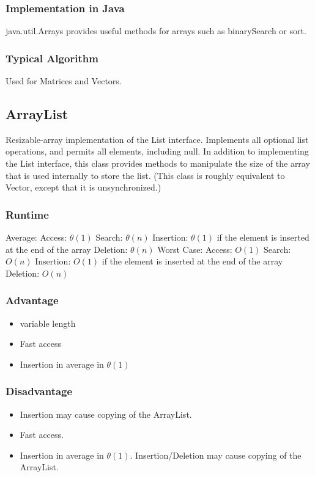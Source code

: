 \documentclass[12pt,a4paper]{article}
\newcommand{\RuntimeHead}{Runtime}
\newcommand{\AdvantageHead}{Advantage}
\newcommand{\DisadvantageHead}{Disadvantage}
\newcommand{\ImplementationInJavaHead}{Implementation in Java}
\newcommand{\TypicalAlgorithmHead}{Typical Algorithm}
\begin{document}
\subsubsection{\ImplementationInJavaHead}
java.util.Arrays provides useful methods for arrays such as binarySearch or sort.

\subsubsection{\TypicalAlgorithmHead}
Used for Matrices and Vectors.

\subsection{ArrayList}
Resizable-array implementation of the List interface. Implements all optional list operations, and permits all elements, including null. In addition to implementing the List interface, this class provides methods to manipulate the size of the array that is used internally to store the list. (This class is roughly equivalent to Vector, except that it is unsynchronized.) 	
\subsubsection{\RuntimeHead}
Average: 
Access: $\theta(1)  $
Search: $\theta(n) $
Insertion: $ \theta(1)$ if the element is inserted at the end of the array
Deletion: $\theta (n)$
\newline
\newline
Worst Case: 
Access: $O(1)$  
Search: $O(n) $
Insertion: $O(1)$ if the element is inserted at the end of the array
Deletion: $O(n)$


\subsubsection{\AdvantageHead}
\begin{itemize}
\item variable length
\item Fast access
\item Insertion in average in $\theta(1)$
\end{itemize}
\subsubsection{\DisadvantageHead}
\begin{itemize}
\item Insertion may cause copying of the ArrayList.
\item Fast access.
\item Insertion in average in $\theta(1)$. Insertion/Deletion may cause copying of the ArrayList.
\end{itemize}
\end{document}
